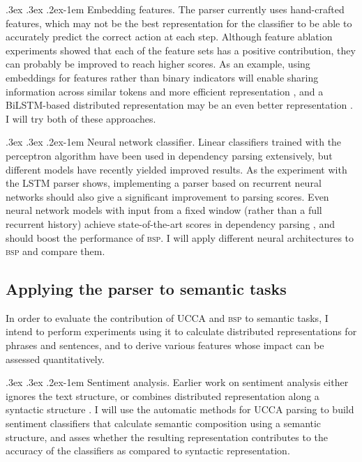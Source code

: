 \documentclass[11pt]{article}
\makeatletter
\renewcommand{\paragraph}{
  \@startsection{paragraph}{4}
  {\z@}{.3ex \@plus .3ex \@minus .2ex}{-1em}
  {\normalfont\normalsize\bfseries}
}
\makeatother
\begin{document}
\paragraph{Embedding features.}
The parser currently uses hand-crafted features, which may not be the best
representation for the classifier to be able to accurately predict the correct action
at each step. Although feature ablation experiments showed that each of the feature
sets has a positive contribution, they can probably be improved to reach higher scores.
As an example, using embeddings for features rather than binary
indicators will enable sharing information across similar tokens and more efficient
representation \cite{chen2014fast},
and a BiLSTM-based distributed representation may be an even better representation
\cite{kiperwasser2016simple}.
I will try both of these approaches.

\paragraph{Neural network classifier.}
Linear classifiers trained with the perceptron algorithm have been used in
dependency parsing extensively, but different models have recently yielded improved
results.
As the experiment with the LSTM parser shows, implementing a parser
based on recurrent neural networks should also give a significant improvement to
parsing scores.
Even neural network models with input from a fixed window (rather than a full recurrent
history) achieve state-of-the-art scores in dependency parsing
\cite{chen2014fast,andor2016globally}, and should boost the performance of \textsc{bsp}.
I will apply different neural architectures to \textsc{bsp} and compare them.

\subsection{Applying the parser to semantic tasks}\label{sec:semantic_tasks}
In order to evaluate the contribution of UCCA and \textsc{bsp} to semantic tasks,
I intend to perform experiments using it to calculate distributed representations for
phrases and sentences, and to derive various features whose impact can be assessed quantitatively.

\paragraph{Sentiment analysis.}
Earlier work on sentiment analysis either ignores the text structure, or
combines distributed representation along a syntactic structure \cite{socher2013recursive}.
I will use the automatic methods for UCCA parsing to build sentiment classifiers that calculate semantic composition
using a semantic structure, and asses whether the resulting representation contributes to the accuracy of the
classifiers as compared to syntactic representation.
\end{document}
